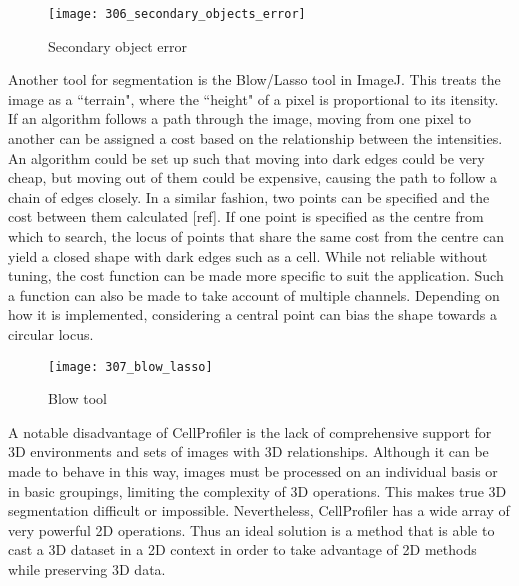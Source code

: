 \begin{figure}[p]
 \centering
 \texttt{[image: 306\_secondary\_objects\_error]}
 \caption{
 	Secondary object error
 }
 \label{fig:secondaryobjecterror}
\end{figure}

Another tool for segmentation is the Blow/Lasso tool in ImageJ. This treats the image as a ``terrain", where the ``height" of a pixel is proportional to its itensity. If an algorithm follows a path through the image, moving from one pixel to another can be assigned a cost based on the relationship between the intensities. An algorithm could be set up such that moving into dark edges could be very cheap, but moving out of them could be expensive, causing the path to follow a chain of edges closely. In a similar fashion, two points can be specified and the cost between them calculated [ref]. If one point is specified as the centre from which to search, the locus of points that share the same cost from the centre can yield a closed shape with dark edges such as a cell. While not reliable without tuning, the cost function can be made more specific to suit the application. Such a function can also be made to take account of multiple channels. Depending on how it is implemented, considering a central point can bias the shape towards a circular locus.

\begin{figure}[p]
 \centering
 \texttt{[image: 307\_blow\_lasso]}
 \caption{
 	Blow tool
 }
 \label{fig:blow}
\end{figure}

A notable disadvantage of CellProfiler is the lack of comprehensive support for 3D environments and sets of images with 3D relationships. Although it can be made to behave in this way, images must be processed on an individual basis or in basic groupings, limiting the complexity of 3D operations. This makes true 3D segmentation difficult or impossible. Nevertheless, CellProfiler has a wide array of very powerful 2D operations. Thus an ideal solution is a method that is able to cast a 3D dataset in a 2D context in order to take advantage of 2D methods while preserving 3D data.

